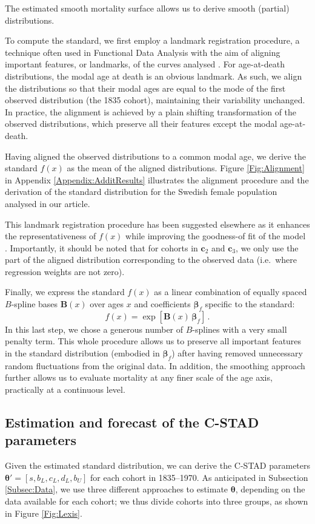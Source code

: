 \documentclass[11pt, a4paper]{article}
\begin{document}
The estimated smooth mortality surface allows us to derive smooth (partial) distributions. {\color{red}To compute the standard, we first employ a landmark registration procedure, a technique often used in Functional Data Analysis with the aim of aligning important features, or landmarks, of the curves analysed \citep{ramsay2005FDA}. For age-at-death distributions, the modal age at death is an obvious landmark. As such, we align the distributions so that their modal ages are equal to the mode of the first observed distribution (the 1835 cohort), maintaining their variability unchanged. In practice, the alignment is achieved by a plain shifting transformation of the observed distributions, which preserve all their features except the modal age-at-death. 

Having aligned the observed distributions to a common modal age, we derive the standard $f(x)$ as the mean of the aligned distributions. Figure \ref{Fig:Alignment} in Appendix \ref{Appendix:AdditResults} illustrates the alignment procedure and the derivation of the standard distribution for the Swedish female population analysed in our article.} This landmark registration procedure has been suggested elsewhere as it enhances the representativeness of $f(x)$ while improving the goodness-of fit of the model \cite[for additional details, see][]{basellini2019modelling}. Importantly, it should be noted that for cohorts in $\bm{c}_2$ and $\bm{c}_3$, we only use the part of the aligned distribution corresponding  to the observed data (i.e.~where regression weights are not zero). 

Finally, we express the standard $f(x)$ as a linear combination of equally spaced $B$-spline bases $\bm{B}(x)$ over ages $x$ and coefficients $\bm{\beta}_{f}$ specific to the standard:
%
\begin{equation}\label{Eq:standPsplines}
f(x) = \exp\left[ \bm{B}(x) \, \bm{\beta}_{f} \right] \, .
\end{equation}
In this last step, we chose a generous number of $B$-splines with a {\color{red}very small} penalty term. This whole procedure allows us to preserve all important features in the standard distribution (embodied in $\bm{\beta}_{f}$) after having removed unnecessary random fluctuations from the original data. {\color{red}In addition, the smoothing approach further allows us to evaluate mortality at any finer scale of the age axis, practically at a continuous level.}


\subsection{Estimation and forecast of the C-STAD parameters}
\label{Subsec:EstimForeC-STAD}
Given the estimated standard distribution, we can derive the C-STAD parameters $\bm{\theta}'=\left[s,b_{L},c_{L},d_{L},b_{U}\right]$ for each cohort in 1835--1970. As anticipated in Subsection \ref{Subsec:Data}, we use three different approaches to estimate $\bm{\theta}$, depending on the data available for each cohort; we thus divide cohorts into three groups, as shown in Figure \ref{Fig:Lexis}. 
\end{document}
